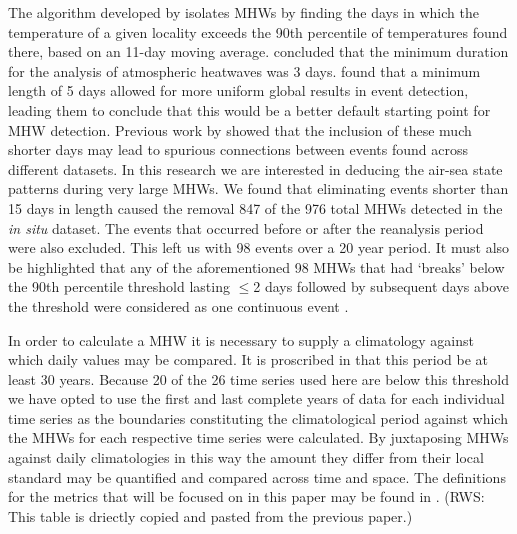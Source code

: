 \documentclass[a4paper,10pt,review]{elsarticle}
\begin{document}
The algorithm developed by \citet{Hobday2016} isolates MHWs by finding the days in which the temperature of a given locality exceeds the 90th percentile of temperatures found there, based on an 11-day moving average. \citet{Perkins2013} concluded that the minimum duration for the analysis of atmospheric heatwaves was 3 days. \citet{Hobday2016} found that a minimum length of 5 days allowed for more uniform global results in event detection, leading them to conclude that this would be a better default starting point for MHW detection. Previous work by \citet{Schlegel2016} showed that the inclusion of these much shorter days may lead to spurious connections between events found across different datasets. In this research we are interested in deducing the air-sea state patterns during very large MHWs. We found that eliminating events shorter than 15 days in length caused the removal 847 of the 976 total MHWs detected in the \emph{in situ} dataset. The events that occurred before or after the reanalysis period were also excluded. This left us with 98 events over a 20 year period. It must also be highlighted that any of the aforementioned 98 MHWs that had `breaks' below the 90th percentile threshold lasting $\leq$2 days followed by subsequent days above the threshold were considered as one continuous event \citep{Hobday2016}.

In order to calculate a MHW it is necessary to supply a climatology against which daily values may be compared. It is proscribed in \citet{Hobday2016} that this period be at least 30 years. Because 20 of the 26 time series used here are below this threshold we have opted to use the first and last complete years of data for each individual time series as the boundaries constituting the climatological period against which the MHWs for each respective time series were calculated. By juxtaposing MHWs against daily climatologies in this way the amount they differ from their local standard may be quantified and compared across time and space. The definitions for the metrics that will be focused on in this paper may be found in . (RWS: This table is driectly copied and pasted from the previous paper.)
\end{document}

